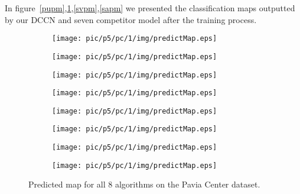 \documentclass{article}
\begin{document}
	In figure~\ref{pupm},\ref{pcpm},\ref{svpm},\ref{sapm} we presented the classification maps outputted by our DCCN and seven competitor
	model after the training process.
	\begin{figure}
		\begin{subfigure}{0.12\textwidth}
			\texttt{[image: pic/p5/pc/1/img/predictMap.eps]}
			\caption{}
		\end{subfigure}
		\begin{subfigure}{0.12\textwidth}
			\texttt{[image: pic/p5/pc/1/img/predictMap.eps]}
			\caption{}
		\end{subfigure}
		\begin{subfigure}{0.12\textwidth}
			\texttt{[image: pic/p5/pc/1/img/predictMap.eps]}
			\caption{}
		\end{subfigure}
		\begin{subfigure}{0.12\textwidth}
			\texttt{[image: pic/p5/pc/1/img/predictMap.eps]}
			\caption{}
		\end{subfigure}
		\begin{subfigure}{0.12\textwidth}
			\texttt{[image: pic/p5/pc/1/img/predictMap.eps]}
			\caption{}
		\end{subfigure}
		\begin{subfigure}{0.12\textwidth}
			\texttt{[image: pic/p5/pc/1/img/predictMap.eps]}
			\caption{}
		\end{subfigure}
		\begin{subfigure}{0.12\textwidth}
			\texttt{[image: pic/p5/pc/1/img/predictMap.eps]}
			\caption{}
		\end{subfigure}
		\begin{subfigure}{0.12\textwidth}
			\texttt{[image: pic/p5/pc/1/img/predictMap.eps]}
			\caption{}
		\end{subfigure}
		\caption{Predicted map for all 8 algorithms on the Pavia Center dataset.}
		\label{pcpm}
	\end{figure}
\end{document}
